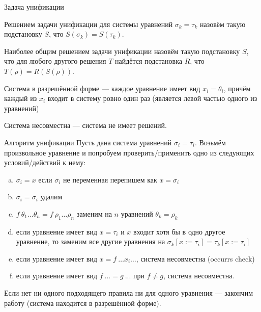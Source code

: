 \documentclass[aspectratio=169]{beamer}
\begin{document}
\begin{frame}{Задача унификации}

\begin{dfn}Решением задачи унификации для системы уравнений $\sigma_k = \tau_k$ назовём такую подстановку
$S$, что $S(\sigma_k) = S(\tau_k)$.
\end{dfn}
\begin{dfn}Наиболее общим решением задачи унификации назовём такую подстановку $S$, что для любого
другого решения $T$ найдётся подстановка $R$, что $T(\rho) = R(S(\rho))$.
\end{dfn}
\begin{dfn}Система в разрешённой форме --- каждое уравнение имеет вид $x_i = \theta_i$, причём
каждый из $x_i$ входит в систему ровно один раз (является левой частью одного из уравнений)
\end{dfn}
\begin{dfn}Система несовместна --- система не имеет решений.\end{dfn}
\end{frame}

\begin{frame}{Алгоритм унификации}
Пусть дана система уравнений $\sigma_i = \tau_i$. 
Возьмём произвольное уравнение и попробуем проверить/применить одно из следующих условий/действий к нему:

		\begin{enumerate}[(a)]
		\item $\sigma_i=x$ если $\sigma_i$ не переменная перепишем как $x=\sigma_i$
		\item $\sigma_i = \sigma_i$ удалим
		\item $f\:\theta_1\hdots\theta_n=f\:\rho_1\hdots\rho_n$ заменим на $n$ уравнений $\theta_k = \rho_k$
		\item если уравнение имеет вид $x=\tau_i$ и $x$ входит хотя бы в одно другое уравнение, то заменим все другие уравнения на $\sigma_k[x := \tau_i] = \tau_k[x := \tau_i]$
		\item если уравнение имеет вид $x = f\ \dots x_i \dots$, система несовместна (occurrs check)
		\item если уравнение имеет вид $f\ ... = g\ ...$ при $f \ne g$, система несовместна.
		\end{enumerate}

Если нет ни одного подходящего правила ни для одного уравнения --- закончим работу (система находится в разрешённой форме).
\end{frame}
\end{document}
